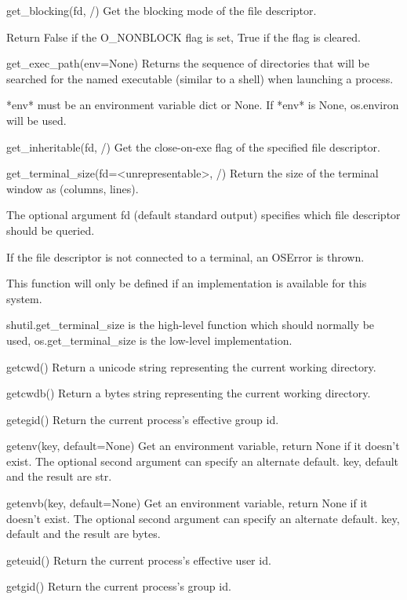 \documentclass{article}
\begin{document}
    get_blocking(fd, /)
        Get the blocking mode of the file descriptor.

        Return False if the O_NONBLOCK flag is set, True if the flag is cleared.

    get_exec_path(env=None)
        Returns the sequence of directories that will be searched for the
        named executable (similar to a shell) when launching a process.

        *env* must be an environment variable dict or None.  If *env* is None,
        os.environ will be used.

    get_inheritable(fd, /)
        Get the close-on-exe flag of the specified file descriptor.

    get_terminal_size(fd=<unrepresentable>, /)
        Return the size of the terminal window as (columns, lines).

        The optional argument fd (default standard output) specifies
        which file descriptor should be queried.

        If the file descriptor is not connected to a terminal, an OSError
        is thrown.

        This function will only be defined if an implementation is
        available for this system.

        shutil.get_terminal_size is the high-level function which should
        normally be used, os.get_terminal_size is the low-level implementation.

    getcwd()
        Return a unicode string representing the current working directory.

    getcwdb()
        Return a bytes string representing the current working directory.

    getegid()
        Return the current process's effective group id.

    getenv(key, default=None)
        Get an environment variable, return None if it doesn't exist.
        The optional second argument can specify an alternate default.
        key, default and the result are str.

    getenvb(key, default=None)
        Get an environment variable, return None if it doesn't exist.
        The optional second argument can specify an alternate default.
        key, default and the result are bytes.

    geteuid()
        Return the current process's effective user id.

    getgid()
        Return the current process's group id.
\end{document}
